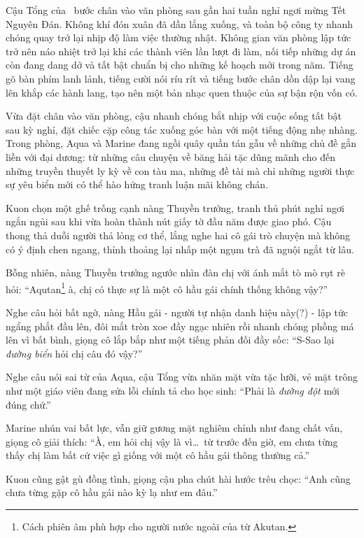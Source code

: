 \documentclass[../main.tex]{subfiles}
\begin{document}
Cậu Tổng của \hll\ bước chân vào văn phòng sau gần hai tuần nghỉ ngơi mừng Tết Nguyên Đán. Không khí đón xuân đã dần lắng xuống, và toàn bộ công ty nhanh chóng quay trở lại nhịp độ làm việc thường nhật. Không gian văn phòng lập tức trở nên náo nhiệt trở lại khi các thành viên lần lượt đi làm, nối tiếp những dự án còn đang dang dở và tất bật chuẩn bị cho những kế hoạch mới trong năm. Tiếng gõ bàn phím lanh lảnh, tiếng cười nói ríu rít và tiếng bước chân dồn dập lại vang lên khắp các hành lang, tạo nên một bản nhạc quen thuộc của sự bận rộn vốn có.

Vừa đặt chân vào văn phòng, cậu nhanh chóng bắt nhịp với cuộc sống tất bật sau kỳ nghỉ, đặt chiếc cặp công tác xuống góc bàn với một tiếng động nhẹ nhàng. Trong phòng, Aqua và Marine đang ngồi quây quần tán gẫu về những chủ đề gắn liền với đại dương: từ những câu chuyện về băng hải tặc dũng mãnh cho đến những truyền thuyết ly kỳ về con tàu ma, những đề tài mà chỉ những người thực sự yêu biển mới có thể hào hứng tranh luận mãi không chán.

Kuon chọn một ghế trống cạnh nàng Thuyền trưởng, tranh thủ phút nghỉ ngơi ngắn ngủi sau khi vừa hoàn thành nút giấy tờ đầu năm được giao phó. Cậu thong thả duỗi người thả lỏng cơ thể, lắng nghe hai cô gái trò chuyện mà không có ý định chen ngang, thỉnh thoảng lại nhấp một ngụm trà đã nguội ngắt từ lâu.

Bỗng nhiên, nàng Thuyền trưởng ngước nhìn đàn chị với ánh mắt tò mò rụt rè hỏi: ``Aqutan\footnote{Cách phiên âm phù hợp cho người nước ngoài của từ Akutan.} à, chị có thực sự là một cô hầu gái chính thống không vậy?''

Nghe câu hỏi bất ngờ, nàng Hầu gái - người tự nhận danh hiệu này(?) - lập tức ngẩng phắt đầu lên, đôi mắt tròn xoe đầy ngạc nhiên rồi nhanh chóng phồng má lên vì bất bình, giọng cô lắp bắp như một tiếng phản đối đầy sốc: ``S-Sao lại \emph{đường biển} hỏi chị câu đó vậy?''


Nghe câu nói sai từ của Aqua, cậu Tổng vừa nhăn mặt vừa tặc lưỡi, vẻ mặt trông như một giáo viên đang sửa lỗi chính tả cho học sinh: ``Phải là \emph{đường đột} mới đúng chứ.''

Marine nhún vai bất lực, vẫn giữ gương mặt nghiêm chỉnh như đang chất vấn, giọng cô giải thích: ``À, em hỏi chị vậy là vì\dots\ từ trước đến giờ, em chưa từng thấy chị làm bất cứ việc gì giống với một cô hầu gái thông thường cả.''

Kuon cũng gật gù đồng tình, giọng cậu pha chút hài hước trêu chọc: ``Anh cũng chưa từng gặp cô hầu gái nào kỳ lạ như em đâu.''
\end{document}
